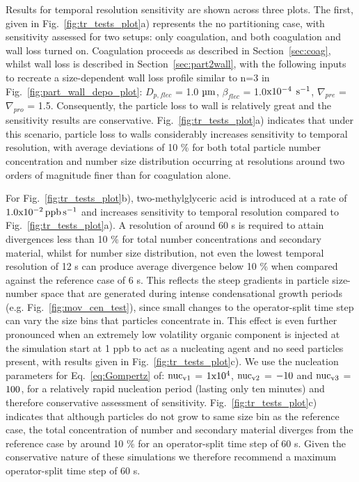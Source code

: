 \documentclass[gmd, manuscript]{copernicus}
\begin{document}
Results for temporal resolution sensitivity are shown across three plots.  The first, given in Fig.~\ref{fig:tr_tests_plot}a) represents the no partitioning case, with sensitivity assessed for two setups: only coagulation, and both coagulation and wall loss turned on.  Coagulation proceeds as described in Section~\ref{sec:coag}, whilst wall loss is described in Section~\ref{sec:part2wall}, with the following inputs to recreate a size-dependent wall loss profile similar to n=3 in Fig.~\ref{fig:part_wall_depo_plot}: $D_{p,flec}$ = 1.0 $\rm{\mu m}$, $\beta_{flec}$ = 1.0$\rm{x10^{-4}}$ $\rm{s^{-1}}$, $\nabla_{pre}$ = $\nabla_{pro}$ = 1.5.  Consequently, the particle loss to wall is relatively great and the sensitivity results are conservative.  Fig.~\ref{fig:tr_tests_plot}a) indicates that under this scenario, particle loss to walls considerably increases sensitivity to temporal resolution, with average deviations of 10 \% for both total particle number concentration and number size distribution occurring at resolutions around two orders of magnitude finer than for coagulation alone.

For Fig.~\ref{fig:tr_tests_plot}b), two-methylglyceric acid is introduced at a rate of $\rm{1.0x10^{-2}\, ppb \, s^{-1}}$ and increases sensitivity to temporal resolution compared to Fig.~\ref{fig:tr_tests_plot}a).  A resolution of around 60 s is required to attain divergences less than 10 \% for total number concentrations and secondary material, whilst for number size distribution, not even the lowest temporal resolution of 12 s can produce average divergence below 10 \% when compared against the reference case of 6 s.  This reflects the steep gradients in particle size-number space that are generated during intense condensational growth periods (e.g. Fig.~\ref{fig:mov_cen_test}), since small changes to the operator-split time step can vary the size bins that particles concentrate in.  This effect is even further pronounced when an extremely low volatility organic component is injected at the simulation start at 1 ppb to act as a nucleating agent and no seed particles present, with results given in Fig.~\ref{fig:tr_tests_plot}c).  We use the nucleation parameters for Eq.~\ref{eq:Gompertz} of: $\rm{nuc_{v1}}$ = $\rm{1x10^4}$, $\rm{nuc_{v2}}$ = $\rm{-10}$ and $\rm{nuc_{v3}}$ = $\rm{100}$, for a relatively rapid nucleation period (lasting only ten minutes) and therefore conservative assessment of sensitivity.  Fig.~\ref{fig:tr_tests_plot}c) indicates that although particles do not grow to same size bin as the reference case, the total concentration of number and secondary material diverges from the reference case by around 10 \% for an operator-split time step of 60 s.  Given the conservative nature of these simulations we therefore recommend a maximum operator-split time step of 60 s.
\end{document}

